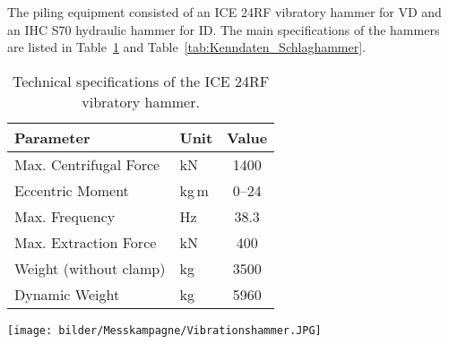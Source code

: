 {%

The piling equipment consisted of an ICE 24RF vibratory hammer for VD and an IHC S70 hydraulic hammer for ID.
The main specifications of the hammers are listed in Table~\ref{tab:Kenndaten_Vibrationshammer} and Table~\ref{tab:Kenndaten_Schlaghammer}.

\begin{table}[htbp]
	\centering
	\caption{Technical specifications of the ICE 24RF vibratory hammer.}
	\label{tab:Kenndaten_Vibrationshammer}
	\begin{minipage}[c]{0.45\textwidth}
		\centering
		\begin{tabular}{@{}llc@{}}
			\toprule
			\textbf{Parameter}     & \textbf{Unit}         & \textbf{Value} \\
			\midrule
			Max. Centrifugal Force & kN     & 1400           \\
			Eccentric Moment       & kg\,m & 0--24          \\
			Max. Frequency         & Hz           & 38.3           \\
			Max. Extraction Force  & kN     & 400            \\
			Weight (without clamp) & kg       & 3500           \\
			Dynamic Weight         & kg       & 5960           \\
			\bottomrule
		\end{tabular}
	\end{minipage}
	\hspace{0.5cm}
	\begin{minipage}[c]{0.4\textwidth}
		\centering
		\texttt{[image: bilder/Messkampagne/Vibrationshammer.JPG]}
	\end{minipage}
\end{table}

}
